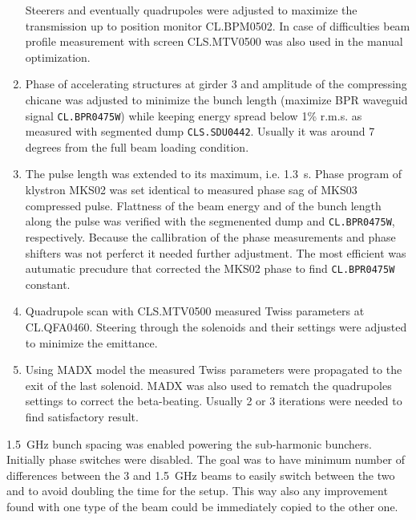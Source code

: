 \begin{enumerate}
Steerers and eventually quadrupoles were adjusted to maximize the transmission 
up to position monitor CL.BPM0502. 
In case of difficulties beam profile measurement with screen CLS.MTV0500 
was also used in the manual optimization.
\item
Phase of accelerating structures at girder 3 and amplitude of the compressing chicane was adjusted to minimize 
the bunch length (maximize BPR waveguid signal \texttt{CL.BPR0475W}) while keeping energy spread below 1\% r.m.s.
as measured with segmented dump \texttt{CLS.SDU0442}. 
Usually it was around 7 degrees from the full beam loading condition.
\item 
The pulse length was extended to its maximum, i.e. 1.3~\textmu s. 
Phase program of klystron MKS02 was set identical to measured phase sag of MKS03 compressed pulse. 
Flattness of the beam energy and of the bunch length along the pulse was verified with 
the segmenented dump and \texttt{CL.BPR0475W}, respectively.
Because the callibration of the phase measurements and phase shifters was not perferct
it needed further adjustment. The most efficient was autumatic precudure
that corrected the MKS02 phase to find \texttt{CL.BPR0475W} constant.
\item
Quadrupole scan with CLS.MTV0500 measured Twiss parameters at CL.QFA0460.
Steering through the solenoids and their settings were adjusted to minimize the emittance. 
\item
Using MADX model the measured Twiss parameters were propagated to the exit of the last solenoid.
MADX was also used to rematch the quadrupoles settings to correct the beta-beating.
Usually 2 or 3 iterations were needed to find satisfactory result. 
\end{enumerate}

1.5~GHz bunch spacing was enabled powering the sub-harmonic bunchers.
Initially phase switches were disabled. 
The goal was to have minimum number of differences between the 3 and 1.5~GHz beams
to easily switch between the two and to avoid doubling the time for the setup.
This way also any improvement found with one type of the beam 
could be immediately copied to the other one.

